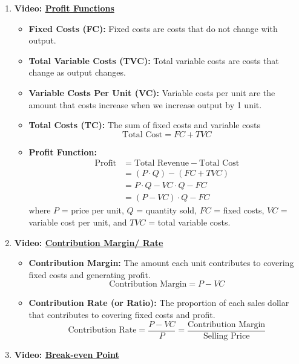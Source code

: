 \documentclass[
]{book}
\providecommand{\tightlist}{%
  \setlength{\itemsep}{0pt}\setlength{\parskip}{0pt}}
\begin{document}
\begin{enumerate}
\def\labelenumi{\arabic{enumi}.}
\tightlist
\item
  \textbf{Video: \href{https://youtu.be/c5i7FsLeDk8}{Profit Functions}}

  \begin{itemize}
  \tightlist
  \item
    \textbf{Fixed Costs (FC):} Fixed costs are costs that do not change with output.
  \item
    \textbf{Total Variable Costs (TVC):} Total variable costs are costs that change as output changes.
  \item
    \textbf{Variable Costs Per Unit (VC):} Variable costs per unit are the amount that costs increase when we increase output by 1 unit.
  \item
    \textbf{Total Costs (TC):} The sum of fixed costs and variable costs \[ \text{Total Cost} = FC + TVC\]
  \item
    \textbf{Profit Function:}
    \begin{align*}
     \text{Profit} &= \text{Total Revenue} - \text{Total Cost} \\
     &= (P \cdot Q) - (FC + TVC)\\
     &= P \cdot Q - VC \cdot Q - FC\\
     &= (P-VC) \cdot Q - FC
     \end{align*}
    where \(P\) = price per unit, \(Q\) = quantity sold, \(FC\) = fixed costs, \(VC\) = variable cost per unit, and \(TVC\) = total variable costs.
  \end{itemize}
\item
  \textbf{Video: \href{https://youtu.be/RMwndvVD894}{Contribution Margin/ Rate}}

  \begin{itemize}
  \tightlist
  \item
    \textbf{Contribution Margin:} The amount each unit contributes to covering fixed costs and generating profit.
    \[
     \text{Contribution Margin} = P - VC
     \]
  \item
    \textbf{Contribution Rate (or Ratio):} The proportion of each sales dollar that contributes to covering fixed costs and profit.
    \[
     \text{Contribution Rate} = \frac{P - VC}{P} = \frac{\text{Contribution Margin}}{\text{Selling Price}}
     \]
  \end{itemize}
\item
  \textbf{Video: \href{https://youtu.be/td4Veo3q4r4}{Break-even Point}}


\end{enumerate}
\end{document}

